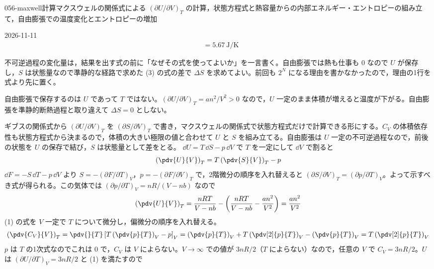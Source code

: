 \documentclass[uplatex,dvipdfmx,a4paper,11pt]{jsarticle}
\begin{document}
\begin{mondai}{056-maxwell}{計算}{マクスウェルの関係式による $(\partial U/\partial V)_{T}$ の計算，状態方程式と熱容量からの内部エネルギー・エントロピーの組み立て，自由膨張での温度変化とエントロピーの増加}
\begin{kotaeutsushi}{2026-11-11}
\begin{align*}
&=\qty{5.67}{\joule\per\kelvin}
\end{align*}
\end{kotaeutsushi}
\begin{kizuki}
\item {} 不可逆過程の変化量は，結果を出す式の前に「なぜその式を使ってよいか」を一言書く。自由膨張では熱も仕事も 0 なので $U$ が保存し，$S$ は状態量なので準静的な経路で求めた (3) の式の差で $\Delta S$ を求めてよい。前回も $2^{N}$ になる理由を書かなかったので，理由の1行を式より先に置く。
\item 自由膨張で保存するのは $U$ であって $T$ ではない。$(\partial U/\partial V)_{T}=an^{2}/V^{2}>0$ なので，$U$ 一定のまま体積が増えると温度が下がる。自由膨張を準静的断熱過程と取り違えて $\Delta S=0$ としない。
\end{kizuki}
\begin{tadashii}
\houshin ギブスの関係式から $(\partial U/\partial V)_{T}$ を $(\partial S/\partial V)_{T}$ で書き，マクスウェルの関係式で状態方程式だけで計算できる形にする。$C_{V}$ の体積依存性も状態方程式から決まるので，体積の大きい極限の値と合わせて $U$ と $S$ を組み立てる。自由膨張は $U$ 一定の不可逆過程なので，前後の状態を $U$ の保存で結び，$S$ は状態量として差をとる。
\keisan {} $\dd U=T\,\dd S-p\,\dd V$ で $T$ を一定にして $\dd V$ で割ると
\[ \left(\pdv{U}{V}\right)_{T}=T\left(\pdv{S}{V}\right)_{T}-p \]
$\dd F=-S\,\dd T-p\,\dd V$ より $S=-(\partial F/\partial T)_{V}$，$p=-(\partial F/\partial V)_{T}$ で，2階微分の順序を入れ替えると $(\partial S/\partial V)_{T}=(\partial p/\partial T)_{V}$。よって示すべき式が得られる。この気体では $(\partial p/\partial T)_{V}=nR/(V-nb)$ なので
\[ \left(\pdv{U}{V}\right)_{T}=\frac{nRT}{V-nb}-\left(\frac{nRT}{V-nb}-\frac{an^{2}}{V^{2}}\right)=\frac{an^{2}}{V^{2}} \]
 (1) の式を $V$ 一定で $T$ について微分し，偏微分の順序を入れ替える。
\[ \left(\pdv{C_{V}}{V}\right)_{T}=\pdv{}{T}\left[T\left(\pdv{p}{T}\right)_{V}-p\right]_{V}=\left(\pdv{p}{T}\right)_{V}+T\left(\pdv[2]{p}{T}\right)_{V}-\left(\pdv{p}{T}\right)_{V}=T\left(\pdv[2]{p}{T}\right)_{V} \]
$p$ は $T$ の1次式なのでこれは $0$ で，$C_{V}$ は $V$ によらない。$V\to\infty$ での値が $3nR/2$（$T$ によらない）なので，任意の $V$ で $C_{V}=3nR/2$。$U$ は $(\partial U/\partial T)_{V}=3nR/2$ と (1) を満たすので

\end{tadashii}
\end{mondai}
\end{document}
